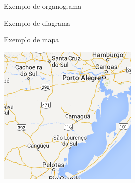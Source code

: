 \begin{organograma}[htb]
	\caption{Exemplo de organograma}
	\label{orga:grafico5}
\end{organograma}
\begin{diagrama}[htb]
	\caption{Exemplo de diagrama}
	\label{diag:grafico6}
\end{diagrama}

\begin{mapa}[htb]
	\caption{Exemplo de mapa}
	\label{map:grafico7}
 	\includegraphics[scale=0.5]{figuras/mapa}
\end{mapa}

